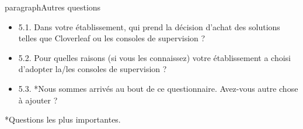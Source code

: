 	paragraph{Autres questions}
	\begin{itemize}
	  \item 5.1. Dans votre établissement, qui prend la décision d’achat des
	  solutions telles que Cloverleaf ou les consoles de supervision ?
	  \item 5.2. Pour quelles raisons (si vous les connaissez) votre établissement a
	  choisi d’adopter la/les consoles de supervision ?
	  \item 5.3. *Nous sommes arrivés au bout de ce questionnaire. Avez-vous autre
	  chose à ajouter ?
	\end{itemize}
	
	*Questions les plus importantes.